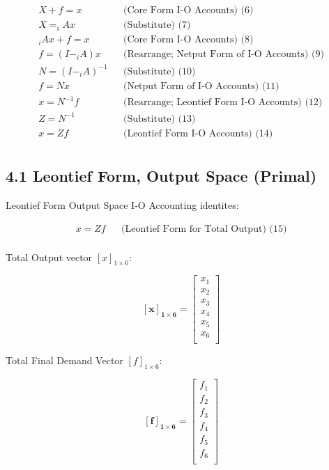 \documentclass[
  letterpaper,
  DIV=11,
  numbers=noendperiod]{scrreprt}
\begin{document}
\[
\begin{align}
    X+f=x && \text{(Core Form I-O Accounts) (6)}\\
    X=_{i}Ax && \text{(Substitute) (7)}\\
    _{i}Ax+f=x && \text{(Core Form I-O Accounts) (8)}\\
        f=(I-_{i}A)x && \text{(Rearrange; Netput Form of I-O Accounts) (9)}\\
    N = (I-_{i}A)^{-1} && \text{(Substitute) (10)}\\
        f=Nx && \text{(Netput Form of I-O Accounts) (11)}\\
    x = N^{-1}f && \text{(Rearrange; Leontief Form I-O Accounts) (12)}\\
    Z = N^{-1} && \text{(Substitute) (13)}\\
    x = Zf && \text{(Leontief Form I-O Accounts) (14)}\\
\end{align}
\]

\subsection{4.1 Leontief Form, Output Space
(Primal)}\label{leontief-form-output-space-primal}

Leontief Form Output Space I-O Accounting identites:

\[
\begin{align}
    x = Zf && \text{(Leontief Form for Total Output) (15)}\\
\end{align}
\]

Total Output vector \([x]_{1\times 6}\):

\[\mathbf{[x]_{1\times 6}} = \left[\begin{array}
{rrr}
x_{1} \\
x_{2} \\
x_{3} \\
x_{4} \\
x_{5} \\
x_{6} \\
\end{array}\right]
\]

Total Final Demand Vector \([f]_{1\times 6}\):

\[\mathbf{[f]_{1\times 6}} = \left[\begin{array}
{rrr}
f_{1} \\
f_{2} \\
f_{3} \\
f_{4} \\
f_{5} \\
f_{6} \\
\end{array}\right]
\]
\end{document}
